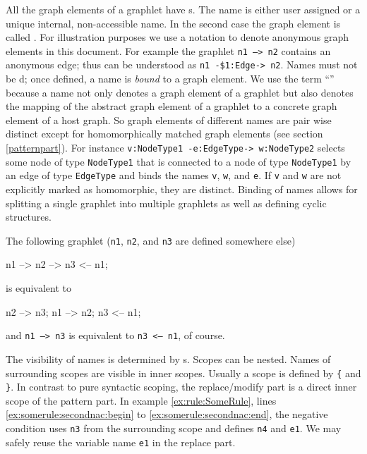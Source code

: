 All the graph elements of a graphlet have s.
The name is either user assigned or a unique internal, non-accessible name.
In the second case the graph element is called .
For illustration purposes we use a  notation to denote anonymous graph elements in this document.
For example the graphlet \texttt{n1 --> n2} contains an anonymous edge; thus can be understood as \texttt{n1 -\$1:Edge-> n2}.
Names must not be d; once defined, a name is \emph{bound} to a graph element. 
We use the term ``'' because a name not only denotes a graph element of a graphlet but also denotes the mapping of the abstract graph element of a graphlet to a concrete graph element of a host graph.
So graph elements of different names are pair wise distinct except for homomorphically matched graph elements (see section \ref{patternpart}).
For instance \texttt{v:NodeType1 -e:EdgeType-> w:NodeType2} selects some node of type \texttt{Node\-Type1} that is connected to a node of type \texttt{NodeType1} by an edge of type \texttt{EdgeType} and binds the names \texttt{v}, \texttt{w}, and \texttt{e}. 
If \texttt{v} and \texttt{w} are not explicitly marked as homomorphic, they are distinct.
Binding of names allows for splitting a single graphlet into multiple graphlets as well as defining cyclic structures.
\begin{example}
The following graphlet (\texttt{n1}, \texttt{n2}, and \texttt{n3} are defined somewhere else)
\begin{grgen}
n1 --> n2 --> n3 <-- n1;
\end{grgen}
is equivalent to
\begin{grgen}
n2 --> n3;
n1 --> n2;
n3 <-- n1;
\end{grgen}
and \texttt{n1 --> n3} is equivalent to \texttt{n3 <-- n1}, of course.
\end{example}
The visibility of names is determined by s. 
Scopes can be nested. 
Names of surrounding scopes are visible in inner scopes. 
Usually a scope is defined by \texttt{\{} and \texttt{\}}.
In contrast to pure syntactic scoping, the replace/modify part is a direct inner scope of the pattern part.
In example \ref{ex:rule:SomeRule}, lines \ref{ex:somerule:secondnac:begin} to \ref{ex:somerule:secondnac:end}, the negative condition uses \texttt{n3} from the surrounding scope and defines \texttt{n4} and \texttt{e1}. 
We may safely reuse the variable name \texttt{e1} in the replace part.

